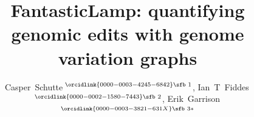 \documentclass{bioinfo}
\theoremstyle{definition}
\begin{document}


\title[FantasticLamp]{FantasticLamp: quantifying genomic edits with genome variation graphs}
\author[Schutte \textit{et~al}.]{

Casper~Schutte\,$^{\orcidlink{0000-0003-4245-6842}\text{\sfb 1}}$,
Ian~T~Fiddes\,$^{\orcidlink{0000-0002-1580-7443}\text{\sfb 2}}$,
Erik~Garrison\,$^{\orcidlink{0000-0003-3821-631X}\text{\sfb 3}*}$
}

\address{
$^{\text{\sf 1}}$Department of Bioinformatics and Computational Biology, University of Stellenbosch, Stellenbosch, 7600, Western Cape, South Africa \\
$^{\text{\sf 2}}$10x Genomics, Pleasanton, CA \\
$^{\text{\sf 3}}$Department of Genetics, Genomics and Informatics, University of Tennessee Health Science Center, Memphis, 38163, Tennessee, USA \\
}



\end{document}
